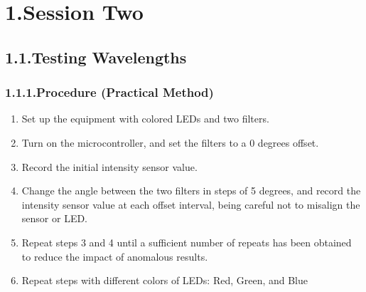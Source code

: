 \documentclass{article}
\begin{document}
\mdxtitleblockstart{}
\mdxauthorstart{}
\mdxauthorend\mdtitleauthorrunning{}{}\mdxtitleblockend%

\section{1.\hspace*{0.5em}Session Two}\label{sec-session-two}%

\subsection{1.1.\hspace*{0.5em}Testing Wavelengths}\label{sec-testing-wavelengths}%

\subsubsection{1.1.1.\hspace*{0.5em}Procedure (Practical Method)}\label{sec-procedure-practical-method}%

\begin{enumerate}[noitemsep,topsep=\mdcompacttopsep]%

\item{}Set up the equipment with colored LEDs and two filters.%

\item{}Turn on the microcontroller, and set the filters to a 0 degrees offset.%

\item{}Record the initial intensity sensor value.%

\item{}Change the angle between the two filters in steps of 5 degrees, and record the intensity sensor value at each offset interval, being careful not to misalign the sensor or LED.%

\item{}Repeat steps 3 and 4 until a sufficient number of repeats has been obtained to reduce the impact of anomalous results.%

\item{}Repeat steps with different colors of LEDs: Red, Green, and Blue%
\end{enumerate}%
\end{document}
